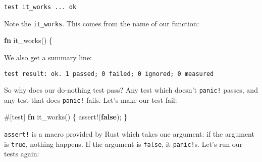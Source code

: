 \documentclass[a4paper,]{book}
\newenvironment{Shaded}{\begin{snugshade}}{\end{snugshade}}
\newcommand{\KeywordTok}[1]{\textcolor[rgb]{0.13,0.29,0.53}{\textbf{{#1}}}}
\newcommand{\StringTok}[1]{\textcolor[rgb]{0.31,0.60,0.02}{{#1}}}
\newcommand{\OtherTok}[1]{\textcolor[rgb]{0.56,0.35,0.01}{{#1}}}
\newcommand{\NormalTok}[1]{{#1}}
\begin{document}
\begin{verbatim}
test it_works ... ok
\end{verbatim}

Note the \texttt{it\_works}. This comes from the name of our function:

\begin{Shaded}
\begin{Highlighting}[]
\KeywordTok{fn} \NormalTok{it_works() \{}
\end{Highlighting}
\end{Shaded}

We also get a summary line:

\begin{verbatim}
test result: ok. 1 passed; 0 failed; 0 ignored; 0 measured
\end{verbatim}

So why does our do-nothing test pass? Any test which doesn't
\texttt{panic!} passes, and any test that does \texttt{panic!} fails.
Let's make our test fail:

\begin{Shaded}
\begin{Highlighting}[]
\OtherTok{#[}\NormalTok{test}\OtherTok{]}
\KeywordTok{fn} \NormalTok{it_works() \{}
    \OtherTok{assert!}\NormalTok{(}\KeywordTok{false}\NormalTok{);}
\NormalTok{\}}
\end{Highlighting}
\end{Shaded}

\texttt{assert!} is a macro provided by Rust which takes one argument:
if the argument is \texttt{true}, nothing happens. If the argument is
\texttt{false}, it \texttt{panic!}s. Let's run our tests again:

\begin{Shaded}
\end{Shaded}
\end{document}

